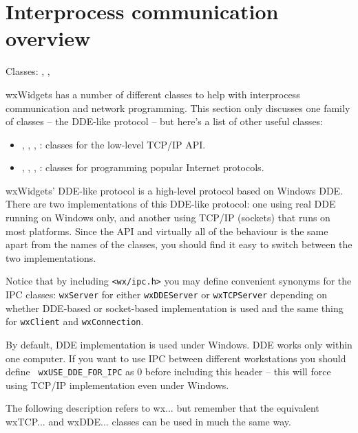 \section{Interprocess communication overview}\label{ipcoverview}

Classes: ,
,

wxWidgets has a number of different classes to help with
interprocess communication and network programming. This section
only discusses one family of classes -- the DDE-like protocol --
but here's a list of other useful classes:

\begin{itemize}\itemsep=0pt
\item {},
,
,
: classes for the low-level TCP/IP API.
\item {}, , , : classes
for programming popular Internet protocols.
\end{itemize}

wxWidgets' DDE-like protocol is a high-level protocol based on
Windows DDE. There are two implementations of this DDE-like
protocol: one using real DDE running on Windows only, and another
using TCP/IP (sockets) that runs on most platforms. Since the API
and virtually all of the behaviour is the same apart from the
names of the classes, you should find it easy to switch between
the two implementations.

Notice that by including {\tt <wx/ipc.h>} you may define
convenient synonyms for the IPC classes: {\tt wxServer} for either
{\tt wxDDEServer} or {\tt wxTCPServer} depending on whether
DDE-based or socket-based implementation is used and the same
thing for {\tt wxClient} and {\tt wxConnection}.

By default, DDE implementation is used under Windows. DDE works
only within one computer. If you want to use IPC between
different workstations you should define {\tt
wxUSE\_DDE\_FOR\_IPC} as $0$ before including this header -- this
will force using TCP/IP implementation even under Windows.

The following description refers to wx... but remember that the
equivalent wxTCP... and wxDDE... classes can be used in much the
same way.

